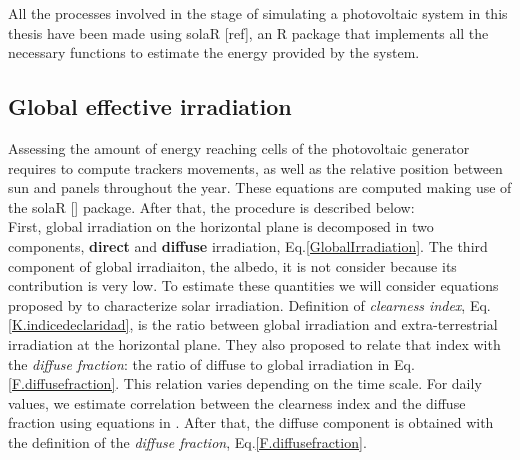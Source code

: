 

All the processes involved in the stage of simulating a photovoltaic system in this thesis have been made using solaR [ref], an R package that implements all the necessary functions to estimate the energy provided by the system.

\subsection{Global effective irradiation}

Assessing the amount of energy reaching cells of the photovoltaic generator requires to compute trackers movements, as well as the relative position between sun and panels throughout the year. These equations are computed making use of the solaR [] package. After that, the procedure is described below:\\

First, global irradiation on the horizontal plane is decomposed in two components, \textbf{direct} and \textbf{diffuse} irradiation, Eq.\ref{GlobalIrradiation}. The third component of global irradiaiton, the albedo, it is  not consider because its contribution is very low. To estimate these quantities we will consider equations proposed by \cite{Liu1960} to characterize solar irradiation. Definition of \textit{clearness index}, Eq.\ref{K.indicedeclaridad}, is the ratio between global irradiation and extra-terrestrial irradiation at the horizontal plane. They also proposed to relate that index with the \textit{diffuse fraction}: the ratio of diffuse to global irradiation in Eq.\ref{F.diffusefraction}. This relation varies depending on the time scale. For daily values, we estimate correlation between the clearness index and the diffuse fraction using equations in \cite{Aguiar1992}. After that, the diffuse component is obtained with the definition of the \textit{diffuse fraction}, Eq.\ref{F.diffusefraction}.

